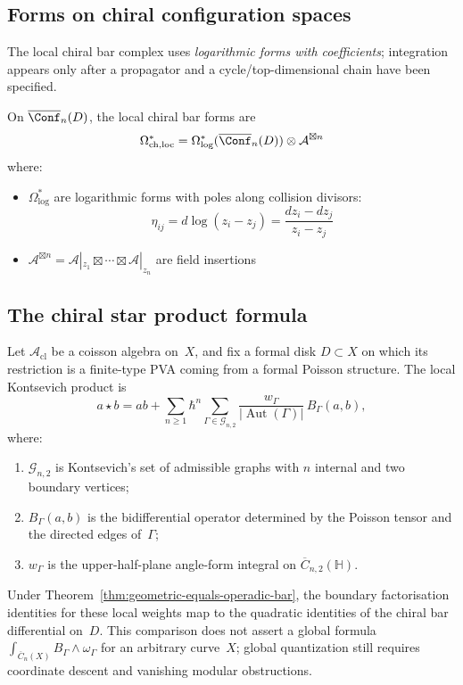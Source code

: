 \subsection{Forms on chiral configuration spaces}

The local chiral bar complex uses \emph{logarithmic forms with
coefficients}; integration appears only after a propagator and a
cycle/top-dimensional chain have been specified.

\begin{definition}
On $\overline{\Conf}_n(D)$, the local chiral bar forms are
\[
\Omega^*_{\mathrm{ch,loc}}
= \Omega^*_{\log}(\overline{\Conf}_n(D))\otimes\mathcal{A}^{\boxtimes n}
\]
where:
\begin{itemize}
\item $\Omega^*_{\text{log}}$ are logarithmic forms with poles along collision divisors:
\[\eta_{ij} = d\log(z_i - z_j) = \frac{dz_i - dz_j}{z_i - z_j}\]
\item $\mathcal{A}^{\boxtimes n} = \mathcal{A}|_{z_1} \boxtimes \cdots \boxtimes \mathcal{A}|_{z_n}$ are field insertions
\end{itemize}
\end{definition}

\subsection{The chiral star product formula}

\begin{theorem}
\label{thm:chiral-kontsevich}
Let $\mathcal{A}_{\mathrm{cl}}$ be a coisson algebra on~$X$, and fix a
formal disk $D\subset X$ on which its restriction is a finite-type PVA
coming from a formal Poisson structure. The local Kontsevich product is
\[
a\star b
=ab+\sum_{n\geq1}\hbar^n
\sum_{\Gamma\in\mathcal G_{n,2}}
\frac{w_\Gamma}{|\operatorname{Aut}(\Gamma)|}\,B_\Gamma(a,b),
\]
where:
\begin{enumerate}
\item $\mathcal{G}_{n,2}$ is Kontsevich's set of admissible graphs
 with $n$ internal and two boundary vertices;
\item $B_\Gamma(a,b)$ is the bidifferential operator determined by the
 Poisson tensor and the directed edges of~$\Gamma$;
\item $w_\Gamma$ is the upper-half-plane angle-form integral on
 $\overline{C}_{n,2}(\mathbb H)$.
\end{enumerate}
Under Theorem~\ref{thm:geometric-equals-operadic-bar}, the boundary
factorisation identities for these local weights map to the quadratic
identities of the chiral bar differential on~$D$. This comparison does
not assert a global formula
\(\int_{\overline{C}_n(X)}B_\Gamma\wedge\omega_\Gamma\) for an
arbitrary curve~$X$; global quantization still requires coordinate
descent and vanishing modular obstructions.
\end{theorem}

